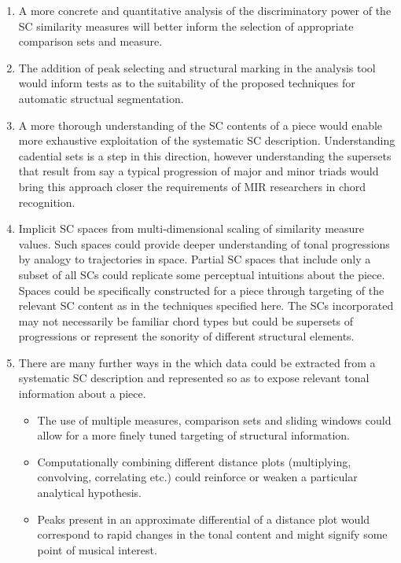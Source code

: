 \documentclass{article}
\begin{document}
\begin{enumerate}
\item A more concrete and quantitative analysis of the discriminatory
   power of the SC similarity measures will better inform the
   selection of appropriate comparison sets and measure.
\item The addition of peak selecting and structural marking in the
   analysis tool would inform tests as to the suitability of the
   proposed techniques for automatic structual segmentation.
\item A more thorough understanding of the SC contents of a piece would
   enable more exhaustive exploitation of the systematic SC
   description. Understanding cadential sets is a step in this
   direction, however understanding the supersets that result from say
   a typical progression of major and minor triads would bring this
   approach closer the requirements of MIR researchers in chord
   recognition.
\item Implicit SC spaces from multi-dimensional scaling of similarity
   measure values. Such spaces could provide deeper understanding of
   tonal progressions by analogy to trajectories in space. Partial SC
   spaces that include only a subset of all SCs could replicate some
   perceptual intuitions about the piece. Spaces could be specifically
   constructed for a piece through targeting of the relevant SC
   content as in the techniques specified here. The SCs incorporated
   may not necessarily be familiar chord types but could be supersets
   of progressions or represent the sonority of different structural
   elements.
\item There are many further ways in the which data could be extracted
   from a systematic SC description and represented so as to expose
   relevant tonal information about a piece.
\begin{itemize}
\item The use of multiple measures, comparison sets and sliding windows
     could allow for a more finely tuned targeting of structural
     information.
\item Computationally combining different distance plots
     (multiplying, convolving, correlating etc.) could reinforce or
     weaken a particular analytical hypothesis.
\item Peaks present in an approximate differential of a distance plot
     would correspond to rapid changes in the tonal content and might
     signify some point of musical interest.
\end{itemize}
\end{enumerate}
\end{document}
